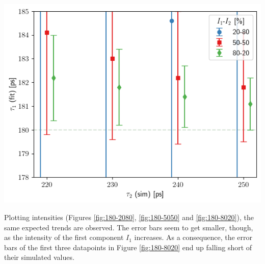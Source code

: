 \begin{minipage}{.45\linewidth}
     
    \includegraphics[width=\linewidth]{Batch 1+2/Batch1+2/output/plotfin/t1zoom.png}
    \label{fig:180-tau1zoom}
\end{minipage}
\vspace{0.5cm}

Plotting intensities (Figures \ref{fig:180-2080}, \ref{fig:180-5050} and \ref{fig:180-8020}), the same expected trends are observed. The error bars seem to get smaller, though, as the intensity of the first component $I_1$ increases. As a consequence, the error bars of the first three datapoints in Figure \ref{fig:180-8020} end up falling short of their simulated values.

